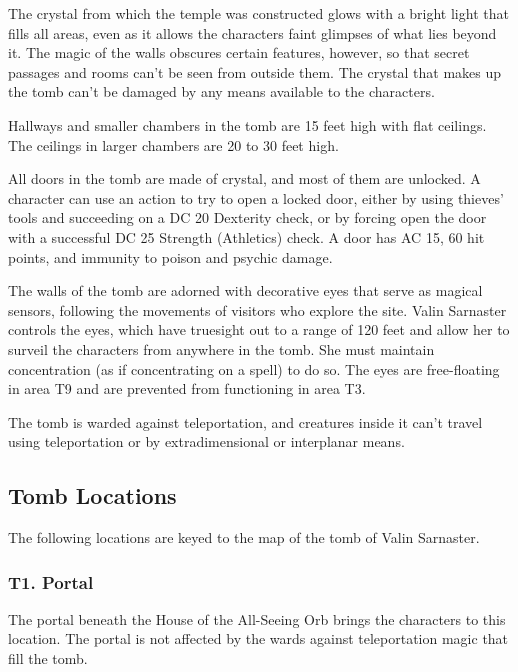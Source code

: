 \documentclass[10pt,a4paper,twoside,bg=print,twocolumn,openany,nodeprecatedcode]{dndbook}
\begin{document}
\begin{description}[nolistsep]
\item[Walls and Floors]
The crystal from which the temple was constructed glows with a bright light that fills all areas, even as it allows the characters faint glimpses of what lies beyond it. The magic of the walls obscures certain features, however, so that secret passages and rooms can't be seen from outside them. The crystal that makes up the tomb can't be damaged by any means available to the characters.
\item[Ceilings]
Hallways and smaller chambers in the tomb are 15 feet high with flat ceilings. The ceilings in larger chambers are 20 to 30 feet high.
\item[Doors]
All doors in the tomb are made of crystal, and most of them are unlocked. A character can use an action to try to open a locked door, either by using thieves' tools and succeeding on a DC 20 Dexterity check, or by forcing open the door with a successful DC 25 Strength (Athletics) check. A door has AC 15, 60 hit points, and immunity to poison and psychic damage.
\item[Eyes of Savras]
The walls of the tomb are adorned with decorative eyes that serve as magical sensors, following the movements of visitors who explore the site. Valin Sarnaster controls the eyes, which have truesight out to a range of 120 feet and allow her to surveil the characters from anywhere in the tomb. She must maintain concentration (as if concentrating on a spell) to do so. The eyes are free-floating in area T9 and are prevented from functioning in area T3.
\item[Extradimensional Interference]
The tomb is warded against teleportation, and creatures inside it can't travel using teleportation or by extradimensional or interplanar means.
\end{description}

\subsection{Tomb Locations}
The following locations are keyed to the map of the tomb of Valin Sarnaster.

\subsubsection{T1. Portal}
The portal beneath the House of the All-Seeing Orb brings the characters to this location. The portal is not affected by the wards against teleportation magic that fill the tomb.
\end{document}

